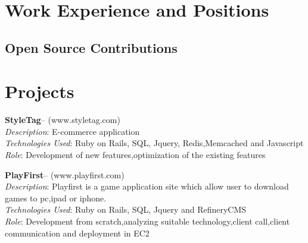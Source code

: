 \documentclass[11pt,a4paper]{moderncv}
\begin{document}

\section{Work Experience and Positions}



\subsection{Open Source Contributions}





\section{Projects}

\cvlistitem
{\textbf{StyleTag}-- {\small(www.styletag.com)}  
  \\\textit{Description}: E-commerce application \\
    \textit{Technologies Used}: Ruby on Rails, SQL, Jquery, Redis,Memcached and Javascript\\
    \textit{Role}: Development of new features,optimization of the existing features\\
}

\cvlistitem
{\textbf{PlayFirst}-- {\small(www.playfirst.com)}  
  \\\textit{Description}: Playfirst is a game application site which allow user to download games to pc,ipad or iphone.\\
    \textit{Technologies Used}: Ruby on Rails, SQL, Jquery and RefineryCMS\\
    \textit{Role}: Development from scratch,analyzing suitable technology,client call,client communication and deployment in EC2\\
}
\end{document}
